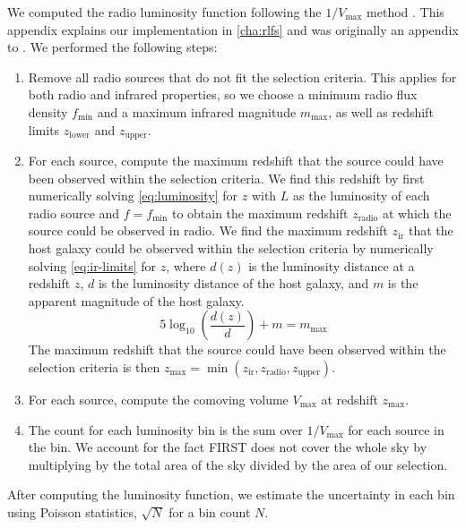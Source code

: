   We computed the radio luminosity function following the $1/V_{\max}$ method
  \citep{schmidt1968vmax}. This appendix explains our implementation in \autoref{cha:rlfs} and was originally an appendix to \citet{alger21rlfs}. We performed the
  following steps:
  \begin{enumerate}
    \item Remove all radio sources that do not fit the selection criteria.
      This applies for both radio and infrared properties, so we choose a minimum radio flux density $f_{\min}$ and a maximum infrared magnitude
      $m_{\max}$, as well as redshift limits $z_{\mathrm{lower}}$ and $z_{\mathrm{upper}}$.
    \item For each source, compute the maximum redshift that the source could
      have been observed within the selection criteria. We find this redshift
      by first numerically solving \autoref{eq:luminosity} for $z$ with $L$ as
      the luminosity of each radio source and $f = f_{\min}$ to obtain the
      maximum redshift $z_\text{radio}$ at which the source could be observed
      in radio. We find the maximum redshift $z_{\text{ir}}$ that the host
      galaxy could be observed within the selection criteria by numerically
      solving \autoref{eq:ir-limits} for $z$, where $d(z)$ is the luminosity
      distance at a redshift $z$, $d$ is the luminosity distance of the host
      galaxy, and $m$ is the apparent magnitude of the host galaxy.
      \begin{equation}
        \label{eq:ir-limits}
        5 \log_{10}\left(\frac{d(z)}{d}\right) + m = m_{\max}
      \end{equation}
      The maximum redshift that the source could have been observed within the
      selection criteria is then $z_{\mathrm{max}} = \min(z_{\mathrm{ir}}, z_{\mathrm{radio}}, z_{\mathrm{upper}})$.
    \item For each source, compute the comoving volume $V_{\mathrm{max}}$ at
      redshift $z_{\mathrm{max}}$.
    \item The count for each luminosity bin is the sum over $1 / V_{\max}$ for
      each source in the bin. We account for the fact FIRST does not cover the
      whole sky by multiplying by the total area of the sky divided by the area
      of our selection.
  \end{enumerate}

  After computing the luminosity function, we estimate the uncertainty in each bin using Poisson statistics, $\sqrt{N}$ for a bin count $N$.

